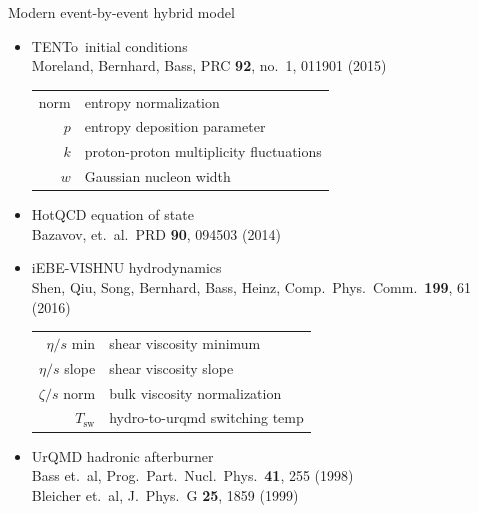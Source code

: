 \documentclass[xcolor=dvipsnames]{beamer}
\newcommand{\trento}{T\raisebox{-0.3ex}{R}ENTo}
\begin{document}
\begin{frame}
\end{frame}

\usebackgroundtemplate{}

\begin{frame}{Modern event-by-event hybrid model}
    \bigskip
    \begin{itemize}
        \item \trento\ initial conditions \\
        {\scriptsize Moreland, Bernhard, Bass, PRC {\bf 92}, no.\ 1, 011901 (2015)} \\
        \begin{table}
            \scriptsize \flushleft
            \begin{tabular}{r l}
                norm & entropy normalization \\ 
                $p$ & entropy deposition parameter \\
                $k$ & proton-proton multiplicity fluctuations \\
                $w$ & Gaussian nucleon width
            \end{tabular}
        \end{table}
        \medskip
        \item HotQCD equation of state \\
        {\scriptsize Bazavov, et.\ al.\ PRD {\bf 90}, 094503 (2014)} \\
        \smallskip 
        \item iEBE-VISHNU hydrodynamics \\
        {\scriptsize Shen, Qiu, Song, Bernhard, Bass, Heinz, Comp.\ Phys.\ Comm.\ {\bf 199}, 61 (2016)}  
        \begin{table}
            \scriptsize \flushleft
            \begin{tabular}{r l}
                $\eta/s$ min & shear viscosity minimum \\ 
                $\eta/s$ slope & shear viscosity slope \\
                $\zeta/s$ norm & bulk viscosity normalization \\
                $T_\text{sw}$ & hydro-to-urqmd switching temp
            \end{tabular}
        \end{table}
        \medskip
        \item UrQMD hadronic afterburner \\
        {\scriptsize Bass et.\ al, Prog.\ Part.\ Nucl.\ Phys.\ {\bf 41}, 255 (1998)} \\
        {\scriptsize Bleicher et.\ al, J.\ Phys.\ G {\bf 25}, 1859 (1999)}
    \end{itemize}
\end{frame}
\end{document}
